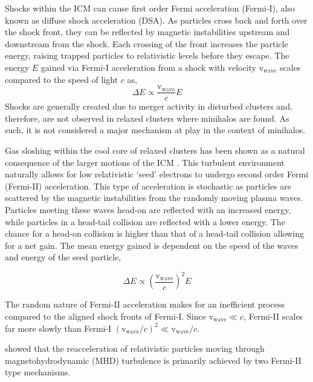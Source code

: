 Shocks within the ICM can cause first order Fermi acceleration (Fermi-I), also known as diffuse shock acceleration (DSA). As particles cross back and forth over the shock front, they can be reflected by magnetic instabilities upstream and downstream from the shock. Each crossing of the front increases the particle energy, raising trapped particles to relativistic levels before they escape. The energy $E$ gained via Fermi-I acceleration from a shock with velocity $\mathrm{v_{wave}}$ scales compared to the speed of light $c$ as,
\begin{equation}
    \Delta E \propto \frac{\mathrm{v_{wave}}}{c}E
    \label{eq:fermi1}
\end{equation}
Shocks are generally created due to merger activity in disturbed clusters and, therefore, are not observed in relaxed clusters where minihalos are found. As such, it is not considered a major mechanism at play in the context of minihalos.

Gas sloshing within the cool core of relaxed clusters has been shown as a natural consequence of the larger motions of the ICM \citep{Fujita2004}. This turbulent environment naturally allows for low relativistic `seed' electrons to undergo second order Fermi (Fermi-II) acceleration. This type of acceleration is stochastic as particles are scattered by the magnetic instabilities from the randomly moving plasma waves. Particles meeting these waves head-on are reflected with an increased energy, while particles in a head-tail collision are reflected with a lower energy. The chance for a head-on collision is higher than that of a head-tail collision allowing for a net gain. The mean energy gained is dependent on the speed of the waves and energy of the seed particle,

\begin{equation}
    \Delta E \propto \left(\frac{\mathrm{v_{wave}}}{c}\right)^2E
    \label{eq:fermi2}
\end{equation}

The random nature of Fermi-II acceleration makes for an inefficient process compared to the aligned shock fronts of Fermi-I. Since $\mathrm{v_{wave}} \ll c$, Fermi-II scales far more slowly than Fermi-I $(\mathrm{v_{wave}}/c)^2 \ll \mathrm{v_{wave}}/c$.

\citet{Brunetti2007} showed that the reacceleration of relativistic particles moving through magnetohydrodynamic (MHD) turbulence is primarily achieved by two Fermi-II type mechanisms. 

